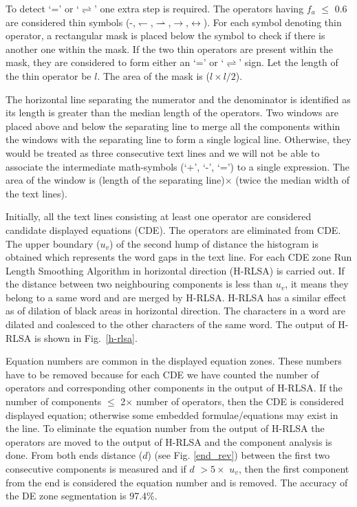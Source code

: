 \documentclass[conference]{IEEEtran}
\begin{document}
To detect `=' or `$\rightleftharpoons$' one extra step is required. 
The operators having $f_a$ $\leq$ 0.6 are considered  thin symbols (-,$\leftharpoondown$,$\rightharpoonup$,$\rightarrow$,$\leftrightarrow$). 
 For each symbol denoting thin operator, a rectangular mask is placed below the
symbol to check if there is another one within the mask. If  the two thin operators are present within the mask, they are considered  to form either
an `=' or `$\rightleftharpoons$' sign. Let the length of the thin operator be $l$. The area of the  mask is  ($l \times l/2$).

The horizontal line separating the numerator and the denominator is identified as its length is greater than the median length of the operators. Two windows are placed above and below the separating line to merge all the components within 
the windows with the separating line to form a single logical line. Otherwise, they  would be treated as three consecutive text lines and we will not be able to associate the intermediate math-symbols (‘+’, ‘-’, ‘=’) to a single expression. The  area of the window is (length of the separating line)$\times$ (twice the median width of the text lines).

Initially, all the text lines consisting at least one operator are considered  candidate displayed equations (CDE).
The operators are eliminated from CDE. The upper boundary ($u_v$) of the second hump of distance the histogram  is obtained which represents the word gaps in the text line. For each CDE zone Run Length Smoothing Algorithm  in horizontal direction (H-RLSA) is carried out. If the distance between two neighbouring components is less  than $u_v$, it means they belong to a same word and  are merged  by H-RLSA. H-RLSA has a similar effect as of dilation of black areas in horizontal  direction. The characters in a word are dilated and coalesced to the other characters of the same word. The output of H-RLSA is shown in Fig.~\ref{h-rlsa}.

Equation numbers are common in the displayed equation zones. These  numbers have to be removed because for each CDE we have counted the number of operators  and  corresponding other components  in the output of H-RLSA. If the number of components 
 $\le$ 2$\times$ number of operators, then the CDE is considered displayed equation;
 otherwise some embedded formulae/equations may exist in the line.
 To eliminate the equation number from the output of H-RLSA  the operators are  moved to the output of H-RLSA and the component 
analysis is done. From both ends distance ($d$) (see Fig. \ref{end_rev}) between the first two consecutive components is measured and if $d$  $> 5\times$  $u_v$, 
then the first component from the end is considered the  equation number and is removed. The accuracy of the DE zone segmentation is 97.4\%.
\end{document}
